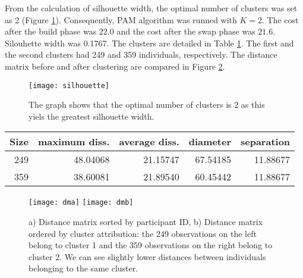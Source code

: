 From the calculation of silhouette width, the optimal number of clusters was set as 2 (Figure \ref{fig:silhouette}). Consequently, PAM algorithm was runned with $K=2$. The cost after the build phase was $22.0$ and the cost after the swap phase was $21.6$. Silouhette width was 0.1767. The clusters are detailed in Table \ref{table:cdes}. The first and the second clusters had 249 and 359 individuals, respectively. The distance matrix before and after clustering are compared in Figure \ref{fig:distancematrix2}.

\begin{figure}
\centering
\captionsetup{singlelinecheck = false, format= hang, justification=raggedright, font=small, labelsep=space}
\texttt{[image: silhouette]}
  \label{fig:silhouette}
\begin{flushleft}
{\footnotesize The graph shows that the optimal number of clusters is 2 as this yiels the greatest silhouette width.}
\end{flushleft}
\end{figure}

\begin{table}
\centering
{}
\begin{tabular}{rrrrr}
\toprule
Size  & maximum diss.  & average diss.  & diameter & separation \\
\midrule
249 & 48.04068 &21.15747 &67.54185 & 11.88677 \\
359& 38.60081 &21.89540& 60.45442 & 11.88677\\
\bottomrule
\end{tabular}
\label{table:cdes}
\end{table}

\begin{figure}
\centering
\captionsetup{singlelinecheck = false, format= hang, justification=raggedright, font=small, labelsep=space}
\texttt{[image: dma]} \hfill
\texttt{[image: dmb]} 
\label{fig:distancematrix2}
\begin{flushleft}
{\footnotesize a) Distance matrix sorted by participant ID, b) Distance matrix ordered by cluster attribution: the 249 observations on the left belong to cluster 1 and the 359 observations on the right belong to cluster 2. We can see slightly lower distances between individuals belonging to the same cluster.}
\end{flushleft}
\end{figure}

